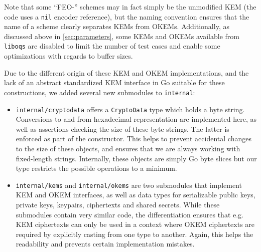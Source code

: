 Note that some ``FEO-'' schemes may in fact simply be the unmodified KEM (the code uses a \texttt{nil} encoder reference), but the naming convention ensures that the name of a scheme clearly separates KEMs from OKEMs. Additionally, as discussed above in \cref{sec:parameters}, some KEMs and OKEMs available from \texttt{liboqs} are disabled to limit the number of test cases and enable some optimizations with regards to buffer sizes.

Due to the different origin of these KEM and OKEM implementations, and the lack of an abstract standardized KEM interface in Go suitable for these constructions, we added several new submodules to \texttt{internal}:
\begin{itemize}
    \item \texttt{internal/cryptodata} offers a \texttt{CryptoData} type which holds a byte string. Conversions to and from hexadecimal representation are implemented here, as well as assertions checking the size of these byte strings. The latter is enforced as part of the constructor. This helps to prevent accidental changes to the size of these objects, and ensures that we are always working with fixed-length strings. Internally, these objects are simply Go byte slices but our type restricts the possible operations to a minimum.

    \item \texttt{internal/kems} and \texttt{internal/okems} are two submodules that implement KEM and OKEM interfaces, as well as data types for serializable public keys, private keys, keypairs, ciphertexts and shared secrets. While these submodules contain very similar code, the differentiation ensures that e.g. KEM ciphertexts can only be used in a context where OKEM ciphertexts are required by explicitly casting from one type to another. Again, this helps the readability and prevents certain implementation mistakes.


\end{itemize}
